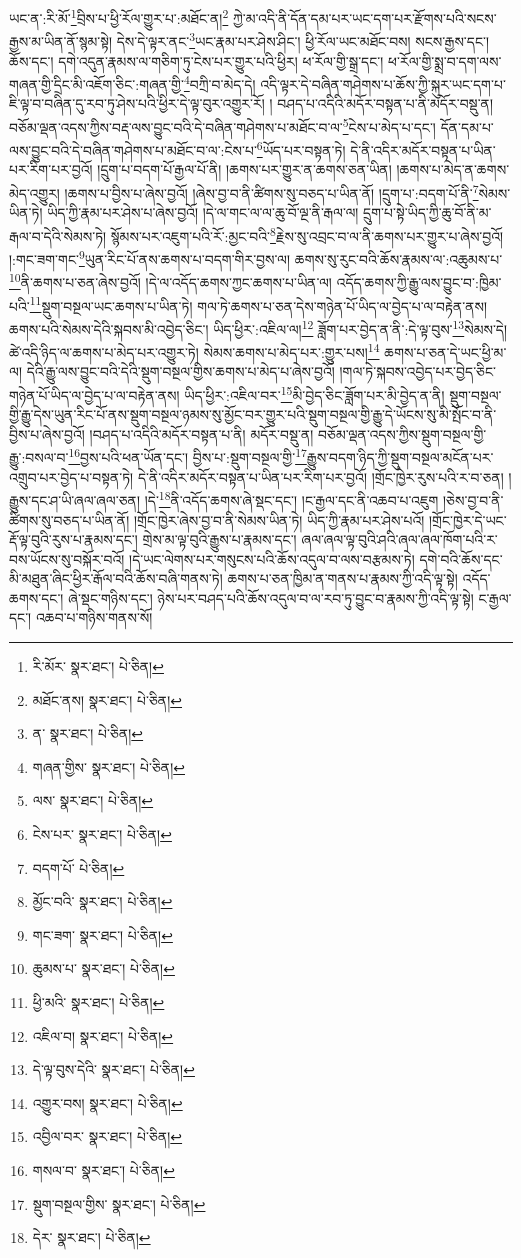 ཡང་ན་:རི་མོ་\footnote{རི་མོར་  སྣར་ཐང་།  པེ་ཅིན། }བྲིས་པ་ཕྱི་རོལ་གྱུར་པ་:མཐོང་ན།\footnote{མཐོང་ནས།  སྣར་ཐང་།  པེ་ཅིན། } ཀྱེ་མ་འདི་ནི་དོན་དམ་པར་ཡང་དག་པར་རྫོགས་པའི་སངས་རྒྱས་མ་ཡིན་ནོ་སྙམ་སྟེ། དེས་དེ་ལྟར་ནང་\footnote{ན་  སྣར་ཐང་།  པེ་ཅིན། }ཡང་རྣམ་པར་ཤེས་ཤིང་། ཕྱི་རོལ་ཡང་མཐོང་བས། སངས་རྒྱས་དང་། ཆོས་དང་། དགེ་འདུན་རྣམས་ལ་གཅིག་ཏུ་ངེས་པར་གྱུར་པའི་ཕྱིར། ཕ་རོལ་གྱི་སྒྲ་དང་། ཕ་རོལ་གྱི་སྨྲ་བ་དག་ལས་གཞན་གྱི་དྲིང་མི་འཇོག་ཅིང་:གཞན་གྱི་\footnote{གཞན་གྱིས་  སྣར་ཐང་།  པེ་ཅིན། }བཀྲི་བ་མེད་དེ། འདི་ལྟར་དེ་བཞིན་གཤེགས་པ་ཆོས་ཀྱི་སྐུར་ཡང་དག་པ་ཇི་ལྟ་བ་བཞིན་དུ་རབ་ཏུ་ཤེས་པའི་ཕྱིར་དེ་ལྟ་བུར་འགྱུར་རོ། །
བཤད་པ་འདིའི་མདོར་བསྟན་པ་ནི་མདོར་བསྡུ་ན། བཅོམ་ལྡན་འདས་ཀྱིས་བརྡ་ལས་བྱུང་བའི་དེ་བཞིན་གཤེགས་པ་མཐོང་བ་ལ་\footnote{ལས་  སྣར་ཐང་།  པེ་ཅིན། }ངེས་པ་མེད་པ་དང་། དོན་དམ་པ་ལས་བྱུང་བའི་དེ་བཞིན་གཤེགས་པ་མཐོང་བ་ལ་:ངེས་པ་\footnote{ངེས་པར་  སྣར་ཐང་།  པེ་ཅིན། }ཡོད་པར་བསྟན་ཏེ། དེ་ནི་འདིར་མདོར་བསྟན་པ་ཡིན་པར་རིག་པར་བྱའོ། །དྲུག་པ་བདག་པོ་རྒྱལ་པོ་ནི། །ཆགས་པར་གྱུར་ན་ཆགས་ཅན་ཡིན། །ཆགས་པ་མེད་ན་ཆགས་མེད་འགྱུར། །ཆགས་པ་བྱིས་པ་ཞེས་བྱའོ། །ཞེས་བྱ་བ་ནི་ཚིགས་སུ་བཅད་པ་ཡིན་ནོ། །དྲུག་པ་:བདག་པོ་ནི་\footnote{བདག་པོ་  པེ་ཅིན། }སེམས་ཡིན་ཏེ། ཡིད་ཀྱི་རྣམ་པར་ཤེས་པ་ཞེས་བྱའོ། །དེ་ལ་གང་ལ་ལ་ཆུ་བོ་ལྔ་ནི་རྒལ་ལ། དྲུག་པ་སྟེ་ཡིད་ཀྱི་ཆུ་བོ་ནི་མ་རྒལ་བ་དེའི་སེམས་ཏེ། སྙོམས་པར་འཇུག་པའི་རོ་:མྱང་བའི་\footnote{མྱོང་བའི་  སྣར་ཐང་།  པེ་ཅིན། }རྗེས་སུ་འབྲང་བ་ལ་ནི་ཆགས་པར་གྱུར་པ་ཞེས་བྱའོ། །:གང་ཟག་གང་\footnote{གང་ཟག་  སྣར་ཐང་།  པེ་ཅིན། }ཡུན་རིང་པོ་ནས་ཆགས་པ་བདག་གིར་བྱས་ལ། ཆགས་སུ་རུང་བའི་ཆོས་རྣམས་ལ་:འཆུམས་པ་\footnote{ཆུམས་པ་  སྣར་ཐང་།  པེ་ཅིན། }ནི་ཆགས་པ་ཅན་ཞེས་བྱའོ། །དེ་ལ་འདོད་ཆགས་ཀྱང་ཆགས་པ་ཡིན་ལ། འདོད་ཆགས་ཀྱི་རྒྱུ་ལས་བྱུང་བ་:ཁྱིམ་པའི་\footnote{ཕྱི་མའི་  སྣར་ཐང་།  པེ་ཅིན། }སྡུག་བསྔལ་ཡང་ཆགས་པ་ཡིན་ཏེ། གལ་ཏེ་ཆགས་པ་ཅན་དེས་གཉེན་པོ་ཡིད་ལ་བྱེད་པ་ལ་བརྟེན་ནས། ཆགས་པའི་སེམས་དེའི་སྐབས་མི་འབྱེད་ཅིང་། ཡིད་ཕྱིར་:འཇིལ་ལ།\footnote{འཇིལ་བ།  སྣར་ཐང་།  པེ་ཅིན། } ཟློག་པར་བྱེད་ན་ནི་:དེ་ལྟ་བུས་\footnote{དེ་ལྟ་བུས་དེའི་  སྣར་ཐང་།  པེ་ཅིན། }སེམས་དེ། ཚེ་འདི་ཉིད་ལ་ཆགས་པ་མེད་པར་འགྱུར་ཏེ། སེམས་ཆགས་པ་མེད་པར་:གྱུར་པས།\footnote{འགྱུར་བས།  སྣར་ཐང་།  པེ་ཅིན། } ཆགས་པ་ཅན་དེ་ཡང་ཕྱི་མ་ལ། དེའི་རྒྱུ་ལས་བྱུང་བའི་དེའི་སྡུག་བསྔལ་གྱིས་ཆགས་པ་མེད་པ་ཞེས་བྱའོ། །གལ་ཏེ་སྐབས་འབྱེད་པར་བྱེད་ཅིང་གཉེན་པོ་ཡིད་ལ་བྱེད་པ་ལ་བརྟེན་ནས། ཡིད་ཕྱིར་:འཇིལ་བར་\footnote{འབྱིལ་བར་  སྣར་ཐང་།  པེ་ཅིན། }མི་བྱེད་ཅིང་ཟློག་པར་མི་བྱེད་ན་ནི། སྡུག་བསྔལ་གྱི་རྒྱུ་དེས་ཡུན་རིང་པོ་ནས་སྡུག་བསྔལ་ཉམས་སུ་མྱོང་བར་གྱུར་པའི་སྡུག་བསྔལ་གྱི་རྒྱུ་དེ་ཡོངས་སུ་མི་སྤོང་བ་ནི་བྱིས་པ་ཞེས་བྱའོ། །བཤད་པ་འདིའི་མདོར་བསྟན་པ་ནི། མདོར་བསྡུ་ན། བཅོམ་ལྡན་འདས་ཀྱིས་སྡུག་བསྔལ་གྱི་རྒྱུ་:བསལ་བ་\footnote{གསལ་བ་  སྣར་ཐང་།  པེ་ཅིན། }བྱས་པའི་ཕན་ཡོན་དང་། བྱིས་པ་:སྡུག་བསྔལ་གྱི་\footnote{སྡུག་བསྔལ་གྱིས་  སྣར་ཐང་།  པེ་ཅིན། }རྒྱུས་བདག་ཉིད་ཀྱི་སྡུག་བསྔལ་མངོན་པར་འགྲུབ་པར་བྱེད་པ་བསྟན་ཏེ། དེ་ནི་འདིར་མདོར་བསྟན་པ་ཡིན་པར་རིག་པར་བྱའོ། །གྲོང་ཁྱེར་རུས་པའི་ར་བ་ཅན། །རྒྱུས་དང་ཤ་ཡི་ཞལ་ཞལ་ཅན། །དེ་\footnote{དེར་  སྣར་ཐང་།  པེ་ཅིན། }ནི་འདོད་ཆགས་ཞེ་སྡང་དང་། །ང་རྒྱལ་དང་ནི་འཆབ་པ་འཇུག །ཅེས་བྱ་བ་ནི་ཚིགས་སུ་བཅད་པ་ཡིན་ནོ། །གྲོང་ཁྱེར་ཞེས་བྱ་བ་ནི་སེམས་ཡིན་ཏེ། ཡིད་ཀྱི་རྣམ་པར་ཤེས་པའོ། །གྲོང་ཁྱེར་དེ་ཡང་རྡོ་ལྟ་བུའི་རུས་པ་རྣམས་དང་། གྲེས་མ་ལྟ་བུའི་རྒྱུས་པ་རྣམས་དང་། ཞལ་ཞལ་ལྟ་བུའི་ཤའི་ཞལ་ཞལ་ཁོག་པའི་ར་བས་ཡོངས་སུ་བསྐོར་བའོ། །དེ་ཡང་ལེགས་པར་གསུངས་པའི་ཆོས་འདུལ་བ་ལས་བརྩམས་ཏེ། དགེ་བའི་ཆོས་དང་མི་མཐུན་ཞིང་ཕྱིར་རྒོལ་བའི་ཆོས་བཞི་གནས་ཏེ། ཆགས་པ་ཅན་ཁྱིམ་ན་གནས་པ་རྣམས་ཀྱི་འདི་ལྟ་སྟེ། འདོད་ཆགས་དང་། ཞེ་སྡང་གཉིས་དང་། ཉེས་པར་བཤད་པའི་ཆོས་འདུལ་བ་ལ་རབ་ཏུ་བྱུང་བ་རྣམས་ཀྱི་འདི་ལྟ་སྟེ། ང་རྒྱལ་དང་། འཆབ་པ་གཉིས་གནས་སོ། 